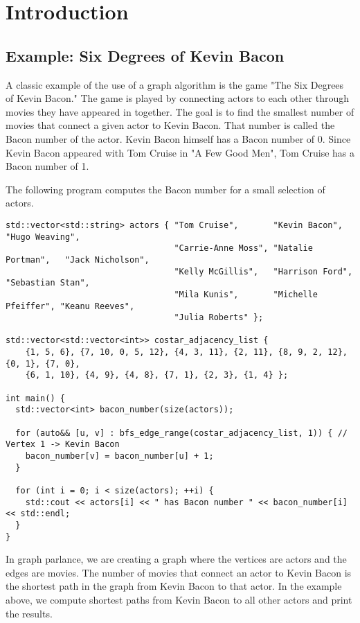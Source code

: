 
\chapter{Introduction}

\section{Example: Six Degrees of Kevin Bacon}

A classic example of the use of a graph algorithm is the game "The Six Degrees of Kevin Bacon."
The game is played by connecting actors to each other through movies they have appeared in together.
The goal is to find the smallest number of movies that connect a given actor to Kevin Bacon.
That number is called the Bacon number of the actor.  Kevin Bacon himself has a Bacon number of 0.
Since Kevin Bacon appeared with Tom Cruise in "A Few Good Men", Tom Cruise has a Bacon number of 1.

The following program computes the Bacon number for a small selection of actors.
{\small
\begin{lstlisting}
std::vector<std::string> actors { "Tom Cruise",       "Kevin Bacon",       "Hugo Weaving",
                                  "Carrie-Anne Moss", "Natalie Portman",   "Jack Nicholson",
                                  "Kelly McGillis",   "Harrison Ford",     "Sebastian Stan",
                                  "Mila Kunis",       "Michelle Pfeiffer", "Keanu Reeves",
                                  "Julia Roberts" };

std::vector<std::vector<int>> costar_adjacency_list {
    {1, 5, 6}, {7, 10, 0, 5, 12}, {4, 3, 11}, {2, 11}, {8, 9, 2, 12}, {0, 1}, {7, 0},
    {6, 1, 10}, {4, 9}, {4, 8}, {7, 1}, {2, 3}, {1, 4} };

int main() {
  std::vector<int> bacon_number(size(actors));

  for (auto&& [u, v] : bfs_edge_range(costar_adjacency_list, 1)) { // Vertex 1 -> Kevin Bacon
    bacon_number[v] = bacon_number[u] + 1;
  }

  for (int i = 0; i < size(actors); ++i) {
    std::cout << actors[i] << " has Bacon number " << bacon_number[i] << std::endl;
  }
}
\end{lstlisting}
}

In graph parlance, we are creating a graph where the vertices are actors and the edges are movies.
The number of movies that connect an actor to Kevin Bacon is the shortest path in the graph
from Kevin Bacon to that actor.  In the example above, we compute shortest paths from Kevin
Bacon to all other actors and print the results.

